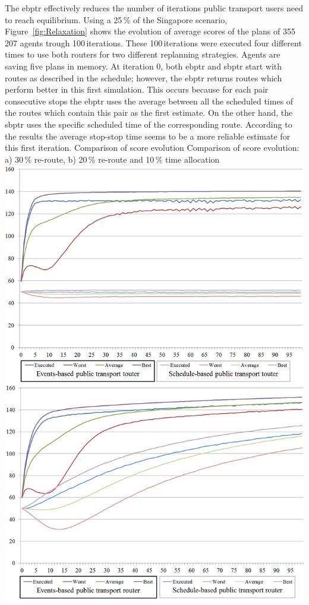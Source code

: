 The \gls{ebptr} effectively reduces the number of iterations public transport users need to reach equilibrium. Using a 25\,\% of the Singapore scenario, Figure~\ref{fig:Relaxation} shows the evolution of average scores of the plans of 355\,207 agents trough 100\,iterations. These 100\,iterations were executed four different times to use both routers for two different replanning strategies. Agents are saving five plans in memory. At iteration 0, both \gls{ebptr} and \gls{sbptr} start with routes as described in the schedule; however, the \gls{ebptr} returns routes which perform better in this first simulation. This occurs because for each pair consecutive stops the \gls{ebptr} uses the average between all the scheduled times of the routes which contain this pair as the first estimate. On the other hand, the \gls{sbptr} uses the specific scheduled time of the corresponding route. According to the results the average stop-stop time seems to be a more reliable estimate for this first iteration.
\createfigure
{Comparison of score evolution}
{Comparison of score evolution: a) 30\,\% re-route, b) 20\,\% re-route and 10\,\% time allocation}
{\label{fig:Relaxation}}
{\includegraphics[width=1.0\textwidth]{extending/figures/ebr/Relaxation.png}}
{}


